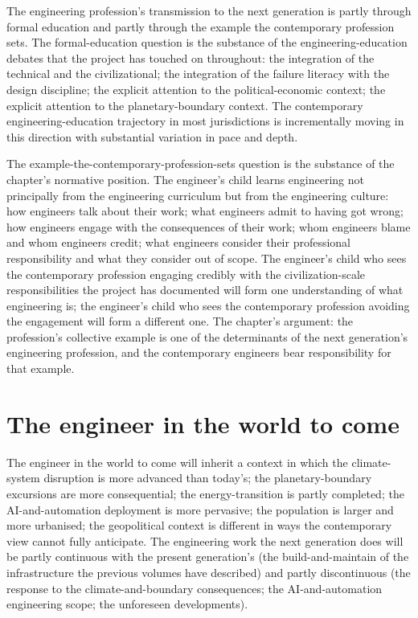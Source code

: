 The engineering profession's transmission to the next generation is partly through formal education and partly through the example the contemporary profession sets. The formal-education question is the substance of the engineering-education debates that the project has touched on throughout: the integration of the technical and the civilizational; the integration of the failure literacy with the design discipline; the explicit attention to the political-economic context; the explicit attention to the planetary-boundary context. The contemporary engineering-education trajectory in most jurisdictions is incrementally moving in this direction with substantial variation in pace and depth.

The example-the-contemporary-profession-sets question is the substance of the chapter's normative position. The engineer's child learns engineering not principally from the engineering curriculum but from the engineering culture: how engineers talk about their work; what engineers admit to having got wrong; how engineers engage with the consequences of their work; whom engineers blame and whom engineers credit; what engineers consider their professional responsibility and what they consider out of scope. The engineer's child who sees the contemporary profession engaging credibly with the civilization-scale responsibilities the project has documented will form one understanding of what engineering is; the engineer's child who sees the contemporary profession avoiding the engagement will form a different one. The chapter's argument: the profession's collective example is one of the determinants of the next generation's engineering profession, and the contemporary engineers bear responsibility for that example.

\section{The engineer in the world to come}

The engineer in the world to come will inherit a context in which the climate-system disruption is more advanced than today's; the planetary-boundary excursions are more consequential; the energy-transition is partly completed; the AI-and-automation deployment is more pervasive; the population is larger and more urbanised; the geopolitical context is different in ways the contemporary view cannot fully anticipate. The engineering work the next generation does will be partly continuous with the present generation's (the build-and-maintain of the infrastructure the previous volumes have described) and partly discontinuous (the response to the climate-and-boundary consequences; the AI-and-automation engineering scope; the unforeseen developments).

